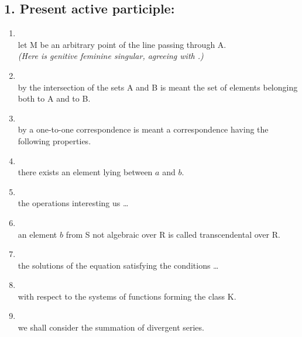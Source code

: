 \begingroup\small\sloppy\subsection*{1. Present active participle: }

\begin{enumerate}[label=1.\arabic*)]
\item {}\\
      let M be an arbitrary point of the line passing through A.\\[-1mm]
      \emph{(Here  is genitive feminine singular, agreeing with .)}
\item {}\\
      by the intersection of the sets A and B is meant the set of elements belonging both to A and to B.
\item {}\\
      by a one-to-one correspondence is meant a correspondence having the following properties.
\item {}\\
      there exists an element lying between $a$ and $b$.
\item {}\\
      the operations interesting us \ldots
\item {}\\
      an element $b$ from S not algebraic over R is called transcendental over R.
\item {}\\
      the solutions of the equation satisfying the conditions \ldots
\item {}\\
      with respect to the systems of functions forming the class K.
\item {}\\
      we shall consider the summation of divergent series.
\end{enumerate}

